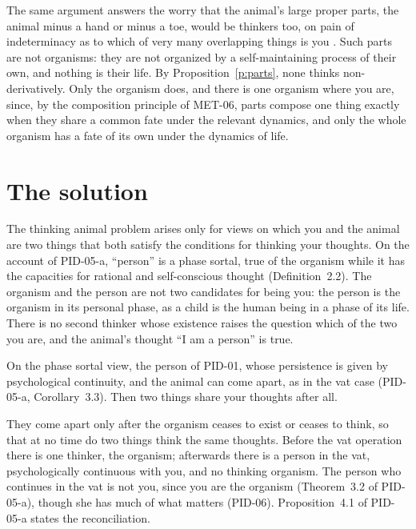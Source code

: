 \documentclass{situationist-preprint}
\begin{document}
The same argument answers the worry that the animal's large proper parts, the animal minus a hand or minus a toe, would be thinkers too, on pain of indeterminacy as to which of very many overlapping things is you \citep{Unger1980}. Such parts are not organisms: they are not organized by a self-maintaining process of their own, and nothing is their life. By Proposition~\ref{p:parts}, none thinks non-derivatively. Only the organism does, and there is one organism where you are, since, by the composition principle of MET-06, parts compose one thing exactly when they share a common fate under the relevant dynamics, and only the whole organism has a fate of its own under the dynamics of life.

\section{The solution}

The thinking animal problem arises only for views on which you and the animal are two things that both satisfy the conditions for thinking your thoughts. On the account of PID-05-a, \enquote{person} is a phase sortal, true of the organism while it has the capacities for rational and self-conscious thought (Definition~2.2). The organism and the person are not two candidates for being you: the person is the organism in its personal phase, as a child is the human being in a phase of its life. There is no second thinker whose existence raises the question which of the two you are, and the animal's thought \enquote{I am a person} is true.

\begin{objection}
On the phase sortal view, the person of PID-01, whose persistence is given by psychological continuity, and the animal can come apart, as in the vat case (PID-05-a, Corollary~3.3). Then two things share your thoughts after all.
\end{objection}

\begin{reply}
They come apart only after the organism ceases to exist or ceases to think, so that at no time do two things think the same thoughts. Before the vat operation there is one thinker, the organism; afterwards there is a person in the vat, psychologically continuous with you, and no thinking organism. The person who continues in the vat is not you, since you are the organism (Theorem~3.2 of PID-05-a), though she has much of what matters (PID-06). Proposition~4.1 of PID-05-a states the reconciliation.
\end{reply}
\end{document}

